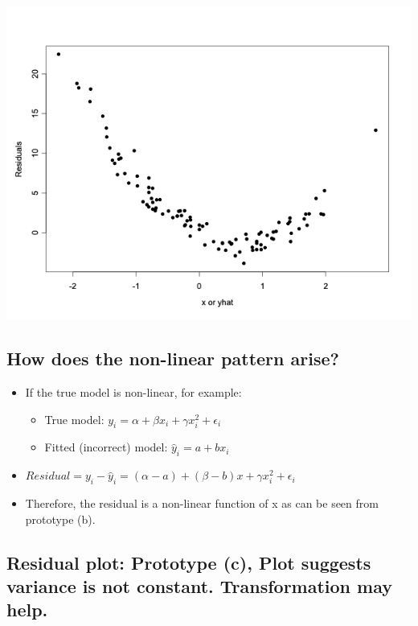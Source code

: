 \documentclass[
]{book}
\providecommand{\tightlist}{%
  \setlength{\itemsep}{0pt}\setlength{\parskip}{0pt}}
\begin{document}
\includegraphics[width=1\linewidth]{./12_42}

\hypertarget{how-does-the-non-linear-pattern-arise}{%
\subsection{How does the non-linear pattern arise?}\label{how-does-the-non-linear-pattern-arise}}

\begin{itemize}
\tightlist
\item
  If the true model is non-linear, for example:

  \begin{itemize}
  \tightlist
  \item
    True model: \(y_i=\alpha+\beta x_i+\gamma x_i^2+\epsilon_i\)
  \item
    Fitted (incorrect) model: \(\hat{y}_i=a+bx_i\)
  \end{itemize}
\item
  \(Residual=y_i-\hat{y}_i=(\alpha-a)+(\beta-b)x+\gamma x_i^2+\epsilon_i\)
\item
  Therefore, the residual is a non-linear function of x as can be seen from prototype (b).
\end{itemize}

\hypertarget{residual-plot-prototype-c-plot-suggests-variance-is-not-constant.-transformation-may-help.}{%
\subsection{Residual plot: Prototype (c), Plot suggests variance is not constant. Transformation may help.}\label{residual-plot-prototype-c-plot-suggests-variance-is-not-constant.-transformation-may-help.}}
\end{document}
